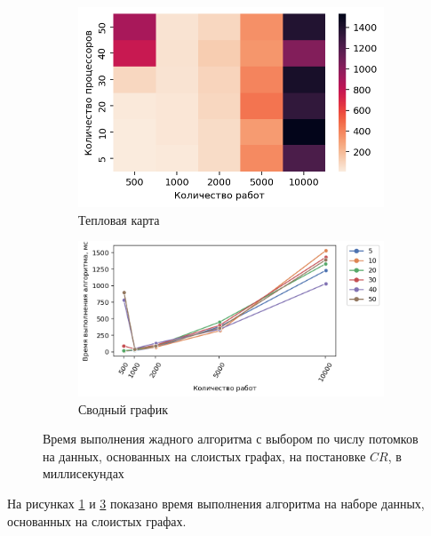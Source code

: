 \begin{figure}[!htbp]
    \centering
    \begin{subfigure}{0.49\textwidth}
        \includegraphics[width=\textwidth]{imgs/layered_class_1/CR/et_heatmap.png}
        \caption{Тепловая карта}
        \label{fig:CR-layered-exec-time-heatmap}
    \end{subfigure}
    \hfill
    \begin{subfigure}{0.49\textwidth}
        \includegraphics[width=\textwidth]{imgs/layered_class_1/CR/tr_graph.png}
        \caption{Сводный график}
        \label{fig:CR-layered-exec-time-compiled}
    \end{subfigure}
    \caption{Время выполнения жадного алгоритма с выбором по числу потомков на данных, основанных на слоистых графах, на постановке $CR$, в миллисекундах}
\end{figure}

На рисунках \ref{fig:CR-layered-exec-time-heatmap} и \ref{fig:CR-layered-exec-time-compiled} показано время выполнения алгоритма на наборе данных, основанных на слоистых графах. 

